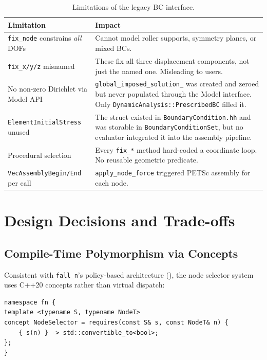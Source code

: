 \begin{table}[ht]
\centering\small
\caption{Limitations of the legacy BC interface.}
\label{tab:bc-gaps}
\begin{tabular}{lp{8cm}}
\toprule
\textbf{Limitation} & \textbf{Impact} \\
\midrule
\texttt{fix\_node} constrains \emph{all} DOFs &
Cannot model roller supports, symmetry planes, or mixed BCs. \\
\texttt{fix\_x/y/z} misnamed &
These fix all three displacement components, not just the named one.
Misleading to users.\\
No non-zero Dirichlet via Model API &
\texttt{global\_imposed\_solution\_} was created and zeroed but never
populated through the Model interface.  Only
\texttt{DynamicAnalysis::PrescribedBC} filled it.\\
\texttt{ElementInitialStress} unused &
The struct existed in \texttt{BoundaryCondition.hh} and was storable in
\texttt{BoundaryConditionSet}, but no evaluator integrated it into the
assembly pipeline.\\
Procedural selection &
Every \texttt{fix\_*} method hard-coded a coordinate loop.  No reusable
geometric predicate.\\
\texttt{VecAssemblyBegin/End} per call &
\texttt{apply\_node\_force} triggered PETSc assembly for each node. \\
\bottomrule
\end{tabular}
\end{table}


\section{Design Decisions and Trade-offs}
\label{sec:bc-design}

\subsection{Compile-Time Polymorphism via Concepts}

Consistent with \texttt{fall\_n}'s policy-based architecture
(), the node selector system uses C++20 concepts
rather than virtual dispatch:

\begin{lstlisting}
namespace fn {
template <typename S, typename NodeT>
concept NodeSelector = requires(const S& s, const NodeT& n) {
    { s(n) } -> std::convertible_to<bool>;
};
}
\end{lstlisting}

